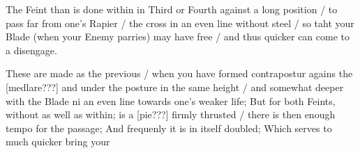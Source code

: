 The Feint than is done within in Third or Fourth against a long
position / to pass far from one's Rapier / the cross in an even line
without steel / so taht your Blade (when your Enemy parries) may have
free / and thus quicker can come to a disengage.


These are made as the previous / when you have formed contrapostur
agains the [medlare???] and under the posture in the
same height / and somewhat deeper with the Blade ni an even line
towards one's weaker life; But for both Feints,
without as well as within; is a [pie???] firmly thrusted / there is
then enough tempo for the passage; And frequenly it is in itself
doubled; Which serves to much quicker bring your